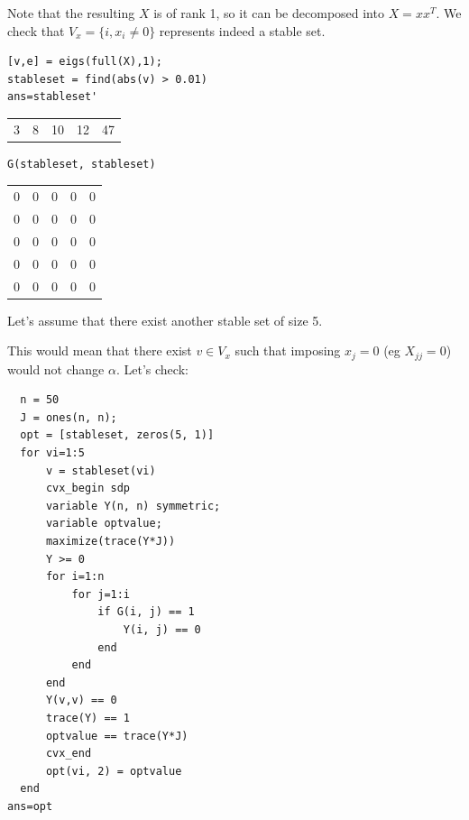 \documentclass[11pt]{article}
\begin{document}
Note that the resulting \(X\) is of rank 1, so it can be decomposed into \(X = xx^T\). We check that \(V_x = \{i , x_i \ne 0\}\) represents indeed a stable set.
\begin{verbatim}
[v,e] = eigs(full(X),1);
stableset = find(abs(v) > 0.01)  
ans=stableset'
\end{verbatim}

\begin{center}
\begin{tabular}{rrrrr}
3 & 8 & 10 & 12 & 47\\
\end{tabular}
\end{center}


\begin{verbatim}
G(stableset, stableset)
\end{verbatim}

\begin{org}
\begin{center}
\begin{tabular}{rrrrr}
0 & 0 & 0 & 0 & 0\\
0 & 0 & 0 & 0 & 0\\
0 & 0 & 0 & 0 & 0\\
0 & 0 & 0 & 0 & 0\\
0 & 0 & 0 & 0 & 0\\
\end{tabular}
\end{center}
\end{org}


Let's assume that there exist another stable set of size 5.

This would mean that there exist \(v \in V_x\) such that imposing \(x_j = 0\) (eg \(X_{jj} =  0\)) would not change \(\alpha\). Let's check:

\begin{verbatim}
  n = 50
  J = ones(n, n);
  opt = [stableset, zeros(5, 1)]
  for vi=1:5
      v = stableset(vi)
      cvx_begin sdp
      variable Y(n, n) symmetric;
      variable optvalue;
      maximize(trace(Y*J))
      Y >= 0
      for i=1:n
          for j=1:i
              if G(i, j) == 1
                  Y(i, j) == 0
              end
          end
      end
      Y(v,v) == 0
      trace(Y) == 1
      optvalue == trace(Y*J)
      cvx_end
      opt(vi, 2) = optvalue
  end
ans=opt
\end{verbatim}
\end{document}
